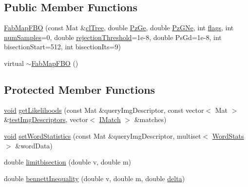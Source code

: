 \subsection*{Public Member Functions}
\begin{DoxyCompactItemize}
\item 
\hyperlink{classcv_1_1of2_1_1FabMapFBO_a4983c5e91e107212184c6206c7441764}{Fab\-Map\-F\-B\-O} (const Mat \&\hyperlink{classcv_1_1of2_1_1FabMap_a54e4331990e8069be69fec53b545c2bd}{cl\-Tree}, double \hyperlink{classcv_1_1of2_1_1FabMap_a0c79d4180f0ffe49bfbfe541b9981e7b}{Pz\-Ge}, double \hyperlink{classcv_1_1of2_1_1FabMap_a0bf851f305f6a00d5a837a7c70e40f3d}{Pz\-G\-Ne}, int \hyperlink{highgui__c_8h_ae51e3a2d4365e85db9630dd3ce9508db}{flags}, int \hyperlink{classcv_1_1of2_1_1FabMap_a023e2c53333bb5505baceb182011980f}{num\-Samples}=0, double \hyperlink{classcv_1_1of2_1_1FabMapFBO_a32ad6da8dc902456924684f3892d1332}{rejection\-Threshold}=1e-\/8, double Ps\-Gd=1e-\/8, int bisection\-Start=512, int bisection\-Its=9)
\item 
virtual \hyperlink{classcv_1_1of2_1_1FabMapFBO_a5da4d27d9ca1181070e16cfeaf58fe71}{$\sim$\-Fab\-Map\-F\-B\-O} ()
\end{DoxyCompactItemize}
\subsection*{Protected Member Functions}
\begin{DoxyCompactItemize}
\item 
\hyperlink{legacy_8hpp_a8bb47f092d473522721002c86c13b94e}{void} \hyperlink{classcv_1_1of2_1_1FabMapFBO_a679103cc67b237f836114d06ccfc461d}{get\-Likelihoods} (const Mat \&query\-Img\-Descriptor, const vector$<$ Mat $>$ \&\hyperlink{classcv_1_1of2_1_1FabMap_a46f350e86965ec1e00ae4bd629dd4c8d}{test\-Img\-Descriptors}, vector$<$ \hyperlink{structcv_1_1of2_1_1IMatch}{I\-Match} $>$ \&matches)
\item 
\hyperlink{legacy_8hpp_a8bb47f092d473522721002c86c13b94e}{void} \hyperlink{classcv_1_1of2_1_1FabMapFBO_ab67c75cc01cca4b5d9ca494138efecc2}{set\-Word\-Statistics} (const Mat \&query\-Img\-Descriptor, multiset$<$ \hyperlink{structcv_1_1of2_1_1FabMapFBO_1_1WordStats}{Word\-Stats} $>$ \&word\-Data)
\item 
double \hyperlink{classcv_1_1of2_1_1FabMapFBO_a87a53e3f52588689c85a62d08c37a655}{limitbisection} (double v, double m)
\item 
double \hyperlink{classcv_1_1of2_1_1FabMapFBO_a42df7b13b8d86906a4c7ee3f0d6a63e3}{bennett\-Inequality} (double v, double m, double \hyperlink{legacy_8hpp_ac867054f00f4be8b1f3ebce6fba31982}{delta})
\end{DoxyCompactItemize}
